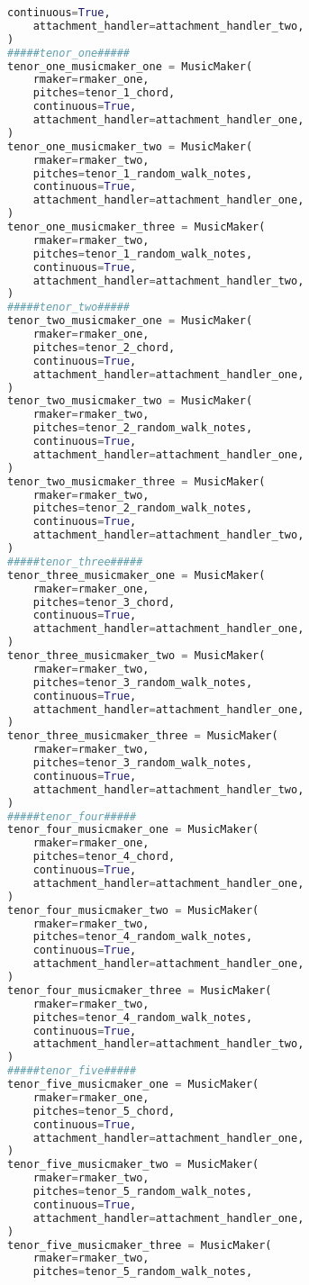 \begin{lstlisting}[language=Python, caption=Invocation Source Code]
    continuous=True,
    attachment_handler=attachment_handler_two,
)
#####tenor_one#####
tenor_one_musicmaker_one = MusicMaker(
    rmaker=rmaker_one,
    pitches=tenor_1_chord,
    continuous=True,
    attachment_handler=attachment_handler_one,
)
tenor_one_musicmaker_two = MusicMaker(
    rmaker=rmaker_two,
    pitches=tenor_1_random_walk_notes,
    continuous=True,
    attachment_handler=attachment_handler_one,
)
tenor_one_musicmaker_three = MusicMaker(
    rmaker=rmaker_two,
    pitches=tenor_1_random_walk_notes,
    continuous=True,
    attachment_handler=attachment_handler_two,
)
#####tenor_two#####
tenor_two_musicmaker_one = MusicMaker(
    rmaker=rmaker_one,
    pitches=tenor_2_chord,
    continuous=True,
    attachment_handler=attachment_handler_one,
)
tenor_two_musicmaker_two = MusicMaker(
    rmaker=rmaker_two,
    pitches=tenor_2_random_walk_notes,
    continuous=True,
    attachment_handler=attachment_handler_one,
)
tenor_two_musicmaker_three = MusicMaker(
    rmaker=rmaker_two,
    pitches=tenor_2_random_walk_notes,
    continuous=True,
    attachment_handler=attachment_handler_two,
)
#####tenor_three#####
tenor_three_musicmaker_one = MusicMaker(
    rmaker=rmaker_one,
    pitches=tenor_3_chord,
    continuous=True,
    attachment_handler=attachment_handler_one,
)
tenor_three_musicmaker_two = MusicMaker(
    rmaker=rmaker_two,
    pitches=tenor_3_random_walk_notes,
    continuous=True,
    attachment_handler=attachment_handler_one,
)
tenor_three_musicmaker_three = MusicMaker(
    rmaker=rmaker_two,
    pitches=tenor_3_random_walk_notes,
    continuous=True,
    attachment_handler=attachment_handler_two,
)
#####tenor_four#####
tenor_four_musicmaker_one = MusicMaker(
    rmaker=rmaker_one,
    pitches=tenor_4_chord,
    continuous=True,
    attachment_handler=attachment_handler_one,
)
tenor_four_musicmaker_two = MusicMaker(
    rmaker=rmaker_two,
    pitches=tenor_4_random_walk_notes,
    continuous=True,
    attachment_handler=attachment_handler_one,
)
tenor_four_musicmaker_three = MusicMaker(
    rmaker=rmaker_two,
    pitches=tenor_4_random_walk_notes,
    continuous=True,
    attachment_handler=attachment_handler_two,
)
#####tenor_five#####
tenor_five_musicmaker_one = MusicMaker(
    rmaker=rmaker_one,
    pitches=tenor_5_chord,
    continuous=True,
    attachment_handler=attachment_handler_one,
)
tenor_five_musicmaker_two = MusicMaker(
    rmaker=rmaker_two,
    pitches=tenor_5_random_walk_notes,
    continuous=True,
    attachment_handler=attachment_handler_one,
)
tenor_five_musicmaker_three = MusicMaker(
    rmaker=rmaker_two,
    pitches=tenor_5_random_walk_notes,

\end{lstlisting}
